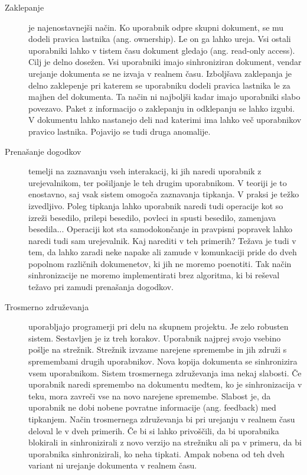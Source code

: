 \documentclass[a4paper, 12pt, twoside]{book}
\begin{document}
\begin{description}
	\item[Zaklepanje] je najenostavnejši način. Ko uporabnik odpre skupni dokument, se mu dodeli pravica lastnika (ang. ownership). Le on ga lahko ureja. Vsi ostali uporabniki lahko v tistem času dokument gledajo (ang. read-only access). Cilj je delno dosežen. Vsi uporabniki imajo sinhroniziran dokument, vendar urejanje dokumenta se ne izvaja v realnem času. Izboljšava zaklepanja je delno zaklepenje pri katerem se uporabniku dodeli pravica lastnika le za majhen del dokumenta. Ta način ni najboljši kadar imajo uporabniki slabo povezavo. Paket z informacijo o zaklepanju in odklepanju se lahko izgubi. V dokumentu lahko nastanejo deli nad katerimi ima lahko več uporabnikov pravico lastnika. Pojavijo se tudi druga anomalije.
	\item[Prenašanje dogodkov] temelji na zaznavanju vseh interakacij, ki jih naredi uporabnik z urejevalnikom, ter pošiljanje le teh drugim uporabnikom. V teoriji je to enostavno, saj vsak sistem omogoča zaznavanja tipkanja. V praksi je težko izvedljivo. Poleg tipkanja lahko uporabnik naredi tudi operacije kot so izreži besedilo, prilepi besedilo, povleci in spusti besedilo, zamenjava besedila... Operaciji kot sta samodokončanje in pravpisni popravek lahko naredi tudi sam urejevalnik. Kaj narediti v teh primerih? Težava je tudi v tem, da lahko zaradi neke napake ali zamude v komunkaciji pride do dveh popolnom različnih dokumenetov, ki jih ne moremo poenotiti. Tak način sinhronizacije ne moremo implementirati brez algoritma, ki bi reševal težavo pri zamudi prenašanja dogodkov.
	\item[Trosmerno združevanja] uporabljajo programerji pri delu na skupnem projektu. Je zelo robusten sistem. Sestavljen je iz treh korakov. Uporabnik najprej svojo vsebino pošlje na strežnik. Strežnik izvzame narejene spremembe in jih združi s spremembami drugih uporabnikov. Nova kopija dokumenta se sinhronizira vsem uporabnikom. Sistem trosmernega združevanja ima nekaj slabosti. Če uporabnik naredi spremembo na dokumentu medtem, ko je sinhronizacija v teku, mora zavreči vse na novo narejene spremembe. Slabost je, da uporabnik ne dobi nobene povratne informacije (ang. feedback) med tipkanjem. Način trosmernega združevanja bi pri urejanju v realnem času deloval le v dveh primerih. Če bi si lahko privoščili, da bi uporabnika blokirali in sinhronizirali z novo verzijo na strežniku ali pa v primeru, da bi uporabnika sinhronizirali, ko neha tipkati. Ampak nobena od teh dveh variant ni urejanje dokumenta v realnem času.
\end{description}
\end{document}
